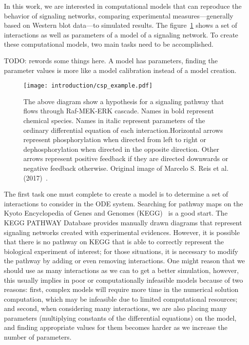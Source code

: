 In this work, we are interested in computational models that can 
reproduce the behavior of signaling networks, comparing experimental 
measures---generally based on Western blot data---to simulated results.
The figure~\ref{fig:signal_pathway_example} shows a set of interactions
as well as parameters of a model of a signaling network. To create these 
computational models, two main tasks need to be accomplished.

{\color{blue} TODO: rewords some things here. A model has parameters, 
finding the parameter values is more like a model calibration instead
of a model creation.}

\begin{figure}[!ht]
\centering 
    \texttt{[image: introduction/csp\_example.pdf]}
\caption{The above diagram show a hypothesis for a signaling pathway 
    that flows through Raf-MEK-ERK cascade. Names in bold represent 
    chemical species. Names in italic represent parameters of the 
    ordinary differential equation of each interaction.Horizontal arrows
    represent phosphorylation when directed from left to right or 
    dephosphorylation when directed in the opposite direction. Other 
    arrows represent positive feedback if they are directed downwards or 
    negative feedback otherwise. Original image of Marcelo S. Reis et
    al. (2017)~\cite{Reis2017}.}
\label{fig:signal_pathway_example}
\end{figure}

The first task one must complete to create a model is to determine a set 
of interactions to consider in the ODE system. Searching for pathway 
maps on the Kyoto Encyclopedia of Genes and Genomes 
(KEGG)~\cite{Kanehisa2000kegg} is a good start. The KEGG PATHWAY 
Database provides manually drawn diagrams that represent signaling 
networks created with experimental evidences. However, it is possible 
that there is no pathway on KEGG that is able to correctly represent the 
biological experiment of interest; for those situations, it is necessary 
to modify the pathway by adding or even removing interactions. One might 
reason that we should use as many interactions as we can to get a better 
simulation, however, this usually implies in poor or computationally 
infeasible models because of two reasons: first, complex models will 
require more time in the numerical solution computation, which may be 
infeasible due to limited computational resources; and second, when 
considering many interactions, we are also placing many parameters 
(multiplying constants of the differential equations) on the model, and 
finding appropriate values for them becomes harder as we increase the 
number of parameters.

